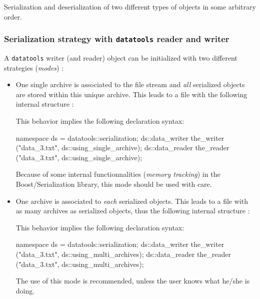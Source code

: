 \documentclass[a4paper,12pt]{article}
\newcommand{\basepath}{.}
\newcommand{\codingpath}{\basepath/coding}
\newcommand{\pn}{\par\noindent}
\begin{document}
\begin{program}[h]
\VerbatimInput[frame=single,
numbers=left,
numbersep=2pt,
firstline=1,
fontsize=\footnotesize,
showspaces=false]{\codingpath/data_3X.cxx}
\caption{Serialization and deserialization of two different  types of  
objects in some arbitrary order. 
}
\label{program:bs:3X}
\end{program}

\subsubsection{Serialization strategy with \texttt{datatools} reader and writer}

\pn A \texttt{datatools} writer (and reader) object can be initialized with two different
strategies (\emph{modes}) :

\begin{itemize}

\item  One  single  archive  is  associated to  the  file  stream  and
  \emph{all}  serialized   objects  are  stored   within  this  unique
  archive. This leads to a  file with the following internal structure
  :

\pn This behavior implies the following declaration syntax:
\begin{CppVerbatim}
namespace ds = datatools::serialization;
ds::data_writer the_writer ("data_3.txt", ds::using_single_archive);
ds::data_reader the_reader ("data_3.txt", ds::using_single_archive);
\end{CppVerbatim}

\pn Because of some internal functionnalities (\emph{memory tracking})
in  the Boost/Serialization  library, this  mode should  be  used with
care.

\item One archive is associated to  \emph{each} serialized
objects. This leads to a file with as many archives as serialized objects, thus 
the following internal
structure :
\pn This behavior implies the following declaration syntax:
\begin{CppVerbatim}
namespace ds = datatools::serialization;
ds::data_writer the_writer ("data_3.txt", ds::using_multi_archives);
ds::data_reader the_reader ("data_3.txt", ds::using_multi_archives);
\end{CppVerbatim}

\pn The use of this mode is recommended, unless the user knows what he/she is doing.
\end{itemize}
\end{document}
